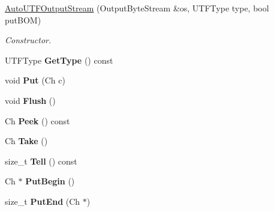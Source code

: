 \begin{DoxyCompactItemize}
\item 
\hyperlink{class_auto_u_t_f_output_stream_a2fe7dbc8e43d11295f66df5653148137}{Auto\+U\+T\+F\+Output\+Stream} (Output\+Byte\+Stream \&os, U\+T\+F\+Type type, bool put\+B\+OM)
\begin{DoxyCompactList}\small\item\em Constructor. \end{DoxyCompactList}\item 
U\+T\+F\+Type {\bfseries Get\+Type} () const \hypertarget{class_auto_u_t_f_output_stream_ac0b150bc3a52534c0e076a02c7708de3}{}\label{class_auto_u_t_f_output_stream_ac0b150bc3a52534c0e076a02c7708de3}

\item 
void {\bfseries Put} (Ch c)\hypertarget{class_auto_u_t_f_output_stream_ad12b33e48c45bdbf2628fd3d5461041a}{}\label{class_auto_u_t_f_output_stream_ad12b33e48c45bdbf2628fd3d5461041a}

\item 
void {\bfseries Flush} ()\hypertarget{class_auto_u_t_f_output_stream_a38b54c84ba0c479552256ac092529f47}{}\label{class_auto_u_t_f_output_stream_a38b54c84ba0c479552256ac092529f47}

\item 
Ch {\bfseries Peek} () const \hypertarget{class_auto_u_t_f_output_stream_ae94659ad6b20e4a89d59a8c98ea6b580}{}\label{class_auto_u_t_f_output_stream_ae94659ad6b20e4a89d59a8c98ea6b580}

\item 
Ch {\bfseries Take} ()\hypertarget{class_auto_u_t_f_output_stream_a44ee7d84ba13fece17574d01b7be574b}{}\label{class_auto_u_t_f_output_stream_a44ee7d84ba13fece17574d01b7be574b}

\item 
size\+\_\+t {\bfseries Tell} () const \hypertarget{class_auto_u_t_f_output_stream_a63ab76ef57db6ab2c2899173e916a6a9}{}\label{class_auto_u_t_f_output_stream_a63ab76ef57db6ab2c2899173e916a6a9}

\item 
Ch $\ast$ {\bfseries Put\+Begin} ()\hypertarget{class_auto_u_t_f_output_stream_a3c7333661dba3d2210f0b287bdd6c1f3}{}\label{class_auto_u_t_f_output_stream_a3c7333661dba3d2210f0b287bdd6c1f3}

\item 
size\+\_\+t {\bfseries Put\+End} (Ch $\ast$)\hypertarget{class_auto_u_t_f_output_stream_a4b16bda191526c894501fce447e95b8d}{}\label{class_auto_u_t_f_output_stream_a4b16bda191526c894501fce447e95b8d}

\end{DoxyCompactItemize}


